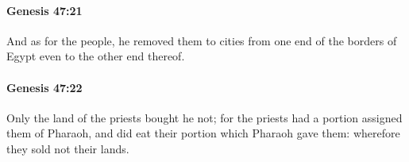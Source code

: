 		\paragraph{Genesis 47:21} %
			\label{GENESIS-47-21}

			And as for the people, he removed them to cities from one end of the borders of Egypt even to the other end thereof.


		\paragraph{Genesis 47:22} %
			\label{GENESIS-47-22}

			Only the land of the priests bought he not; for the priests had a portion assigned them of Pharaoh, and did eat their portion which Pharaoh gave them: wherefore they sold not their lands.


